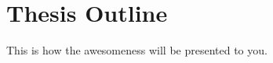 \section{Thesis Outline}
\label{sec:int_outline}

This is how the awesomeness will be presented to you.